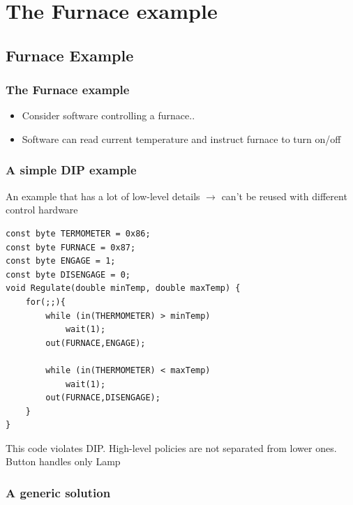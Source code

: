 \documentclass{beamer}
\begin{document}
\section{The Furnace example}
\subsection{Furnace Example}
\begin{frame}
  \frametitle{The Furnace example}
  \begin{itemize}
	\item<+-> Consider software controlling a furnace.. 
	\item<+-> Software can read current temperature and instruct furnace to turn on/off
   \end{itemize}
\end{frame}

\begin{frame}[containsverbatim]
	\frametitle{A simple DIP example}
	An example that has a lot of low-level details $ \rightarrow $ can't be reused with different control hardware \\
	\begin{lstlisting}
const byte TERMOMETER = 0x86;
const byte FURNACE = 0x87;
const byte ENGAGE = 1;
const byte DISENGAGE = 0;
void Regulate(double minTemp, double maxTemp) {
	for(;;){
		while (in(THERMOMETER) > minTemp)
			wait(1);
		out(FURNACE,ENGAGE);
		
		while (in(THERMOMETER) < maxTemp)
			wait(1);
		out(FURNACE,DISENGAGE);
	}
}
	\end{lstlisting}
	This code violates DIP. High-level policies are not separated from lower ones. Button handles only Lamp
\end{frame}


\begin{frame}
	\frametitle{A generic solution}
	\begin{center}
	\end{center}
\end{frame}
\end{document}

